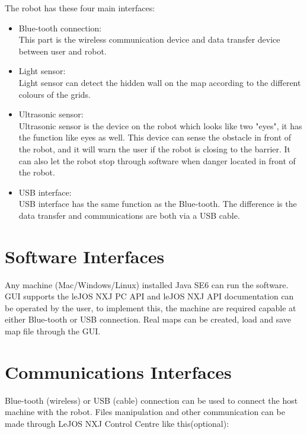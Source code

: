 \documentclass[11pt, a4paper]{report}
\begin{document}
The robot has these four main interfaces:
\begin{itemize}
	\item{Blue-tooth connection:}\\
	This part is the wireless communication device and data transfer device between user and robot. 
	\item{Light sensor:}\\
	Light sensor can detect the hidden wall on the map according to the different colours of the grids.
	\item{Ultrasonic sensor:}\\
	Ultrasonic sensor is the device on the robot which looks like two "eyes", it has the function like eyes as well. This device can sense the obstacle in front of the robot, and it will warn the user if the robot is closing to the barrier. It can also let the robot stop through software when danger located in front of the robot.
	\item{USB interface:}\\
	USB interface has the same function as the Blue-tooth. The difference is the data transfer and communications are both via a USB cable.
\end{itemize}
\pagebreak
\section{Software Interfaces}
Any machine (Mac/Windows/Linux) installed Java SE6 can run the software. GUI supports the leJOS NXJ PC API and leJOS NXJ API documentation can be operated by the user, to implement this, the machine are required capable at either Blue-tooth or USB connection. Real maps can be created, load and save map file through the GUI.


\section{Communications Interfaces}
Blue-tooth (wireless) or USB (cable) connection can be used to connect the host machine with the robot.  Files manipulation and other communication can be made through LeJOS NXJ Control Centre like this(optional): 
\end{document}

